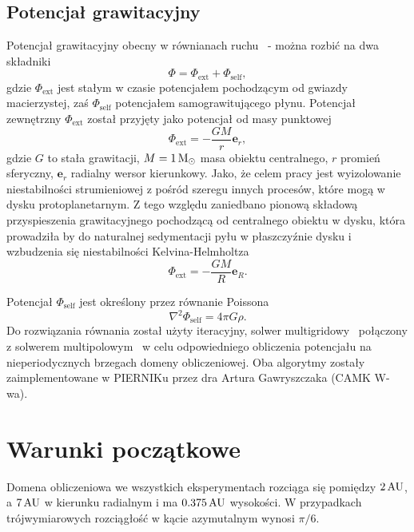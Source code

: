 \subsection{Potencjał grawitacyjny}
Potencjał grawitacyjny obecny w równianach ruchu~ -  można
rozbić na dwa składniki
\begin{equation}
   \Phi = \Phi_{\textrm{ext}} + \Phi_{\textrm{self}},
\end{equation}
gdzie $\Phi_{\textrm{ext}}$ jest stałym w czasie potencjałem pochodzącym od
gwiazdy macierzystej, zaś $\Phi_{\textrm{self}}$ potencjałem samograwitującego
płynu. Potencjał zewnętrzny $\Phi_{\textrm{ext}}$ został przyjęty jako potencjał
od masy punktowej
\begin{equation}
   \Phi_{\textrm{ext}} = -\frac{GM}{r} \mathbf{e}_r,
\end{equation}
gdzie $G$ to stała grawitacji, $M = 1\hbox{$\mathrm{\thinspace M_{\odot}}$}$ masa obiektu centralnego, $r$
promień sferyczny, $\mathbf{e}_r$ radialny wersor kierunkowy.
Jako, że celem pracy jest wyizolowanie niestabilności strumieniowej z pośród
szeregu innych procesów, które mogą w dysku protoplanetarnym. Z tego względu
zaniedbano pionową składową przyspieszenia grawitacyjnego pochodzącą od
centralnego obiektu w dysku, która prowadziła by do naturalnej sedymentacji pyłu
w płaszczyźnie dysku i wzbudzenia się niestabilności
Kelvina-Helmholtza~\cite{JHK06}
\begin{equation}\label{eq:phiext}
   \Phi_{\textrm{ext}} = -\frac{GM}{R} \mathbf{e}_R.
\end{equation}

\par Potencjał $\Phi_{\textrm{self}}$ jest określony przez równanie Poissona
\begin{equation}\label{eq:poisson}
   \nabla^2 \Phi_{\textrm{self}} = 4\pi G \rho.
\end{equation}
Do rozwiązania równania  został użyty iteracyjny, solwer
multigridowy~\citep{HG00} połączony z solwerem multipolowym~\citep{J77} w celu
odpowiedniego obliczenia potencjału na nieperiodycznych brzegach domeny
obliczeniowej. Oba algorytmy zostały zaimplementowane w PIERNIKu przez dra
Artura Gawryszczaka (CAMK W-wa).

\section{Warunki początkowe}
Domena obliczeniowa we wszystkich eksperymentach rozciąga się pomiędzy $2\hbox{$\thinspace\textrm{AU}$}$, a
$7\hbox{$\thinspace\textrm{AU}$}$ w kierunku radialnym i ma $0.375\hbox{$\thinspace\textrm{AU}$}$ wysokości. W przypadkach
trójwymiarowych rozciągłość w kącie azymutalnym wynosi $\pi / 6$.

